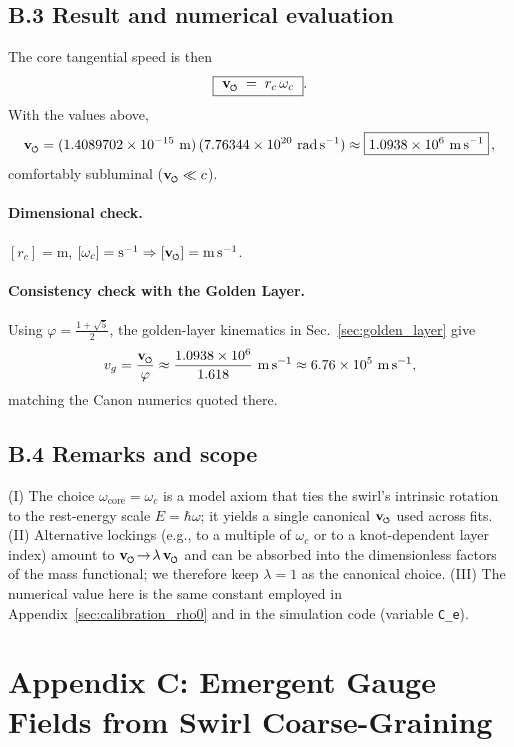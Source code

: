 \documentclass[smallextended]{svjour3}       %
\newcommand{\swirlarrow}{%
	\mathchoice{\mkern-2mu\scriptstyle\boldsymbol{\circlearrowleft}}%
	{\mkern-2mu\scriptstyle\boldsymbol{\circlearrowleft}}%
	{\mkern-2mu\scriptscriptstyle\boldsymbol{\circlearrowleft}}%
	{\mkern-2mu\scriptscriptstyle\boldsymbol{\circlearrowleft}}%
}
\newcommand{\vswirl}{\mathbf{v}_{\swirlarrow}}
\begin{document}
	\subsection*{B.3 Result and numerical evaluation}
	The core tangential speed is then
	\[
		\boxed{\ \vswirl \;=\; r_c\,\omega_c\ } .
	\]
	With the values above,
	\[
		\vswirl
		= (1.4089702\times10^{-15}\ \mathrm{m})\,(7.76344\times10^{20}\ \mathrm{rad\,s^{-1}})
		\approx \boxed{1.0938\times10^{6}\ \mathrm{m\,s^{-1}}}\,,
	\]
	comfortably subluminal (\(\vswirl\ll c\)).

	\paragraph{Dimensional check.}
	\([r_c]=\mathrm{m}\), \([\omega_c]=\mathrm{s^{-1}}\Rightarrow [\vswirl]=\mathrm{m\,s^{-1}}\).

	\paragraph{Consistency check with the Golden Layer.}
	Using \(\varphi=\tfrac{1+\sqrt5}{2}\), the golden-layer kinematics in Sec.~\ref{sec:golden_layer} give
	\[
		v_g=\frac{\vswirl}{\varphi}\approx \frac{1.0938\times10^6}{1.618}\ \mathrm{m\,s^{-1}}
		\approx 6.76\times10^5\ \mathrm{m\,s^{-1}},
	\]
	matching the Canon numerics quoted there.

	\subsection*{B.4 Remarks and scope}
	(I) The choice \(\omega_{\text{core}}=\omega_c\) is a model axiom that ties the swirl’s intrinsic rotation to the rest-energy scale \(E=\hbar\omega\); it yields a single canonical \(\vswirl\) used across fits.
	(II) Alternative lockings (e.g., to a multiple of \(\omega_c\) or to a knot-dependent layer index) amount to \(\vswirl\!\to\! \lambda\,\vswirl\) and can be absorbed into the dimensionless factors of the mass functional; we therefore keep \(\lambda=1\) as the canonical choice.
	(III) The numerical value here is the same constant employed in Appendix~\ref{sec:calibration_rho0} and in the simulation code (variable \texttt{C\_e}).

\section*{Appendix C: Emergent Gauge Fields from Swirl Coarse-Graining}
\label{sec:swirl-connection}
\end{document}
